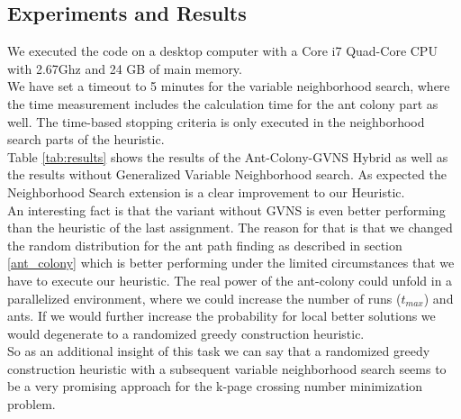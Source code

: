 \documentclass{scrartcl}
\begin{document}
\subsection{Experiments and Results}
We executed the code on a desktop computer with a Core i7 Quad-Core
CPU with 2.67Ghz and 24 GB of main memory. \\


We have set a timeout to 5 minutes for the variable neighborhood search, where the time measurement includes the calculation time for the ant colony part as well. 
The time-based stopping criteria is
only executed in the neighborhood search parts of the heuristic.\\

Table \ref{tab:results} shows the results of the Ant-Colony-GVNS Hybrid as well as the results without
Generalized Variable Neighborhood search.
As expected the Neighborhood Search extension is a clear improvement to our Heuristic. \\

An interesting fact is that the variant without GVNS is even better performing than the 
heuristic of the last assignment. The reason for that is that we changed the random distribution
for the ant path finding as described in section \ref{ant_colony} which is better performing
under the limited circumstances that we have to execute our heuristic. The real power of the ant-colony 
could unfold in a parallelized environment, where we could increase the number of runs ($t_{max}$)
and ants.
If we would further increase the probability for local better solutions we would degenerate
to a randomized greedy construction heuristic. \\

So as an additional insight of this task we can say that a randomized greedy construction heuristic
with a subsequent variable neighborhood search seems to be a very promising approach for
the k-page crossing number minimization problem.
\end{document}
